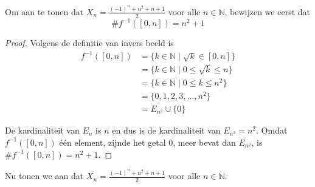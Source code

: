 \documentclass[kulak]{kulakarticle} %
\begin{document}
	Om aan te tonen dat \(X_n=\frac{(-1)^n+n^2+n+1}{2}\) voor alle \(n\in \mathbb{N}\), bewijzen we eerst dat \[\# f^{-1}([0,n])=n^2+1\]

	\begin{proof}
		Volgens de definitie van invers beeld is
		\begin{align*}
			f^{-1}([0,n])		&= \{ k\in \mathbb{N} \mid \sqrt{k}\in [0,n] \} \\
								&= \{ k\in \mathbb{N} \mid 0 \leq \sqrt{k} \leq n \} \\
								&= \{ k\in \mathbb{N} \mid 0 \leq k \leq n^2 \} \\
								&= \{0,1,2,3,...,n^2\}\\
								&= E_{n^2} \cup \{0\}
		\end{align*}

		De kardinaliteit van \(E_n\) is \(n\) en dus is de kardinaliteit van \(E_{n^2}=n^2\). Omdat \(f^{-1}([0,n])\) één element, zijnde het getal 0, meer bevat dan \(E_{n^2}\), is \(\# f^{-1}([0,n])=n^2+1\).

	\end{proof}

	Nu tonen we aan dat \(X_n=\frac{(-1)^n+n^2+n+1}{2}\) voor alle \(n\in \mathbb{N}\).
\end{document}
